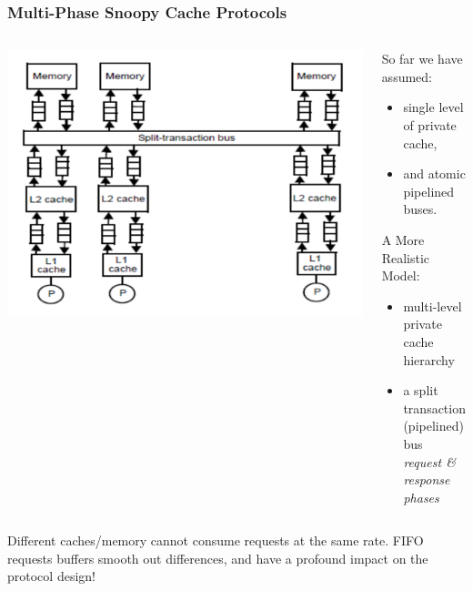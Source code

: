 \documentclass{beamer}
\newcommand{\emp}[1]{\textcolor{DikuRed}{ #1}}
\begin{document}
\begin{frame}[fragile,t]
\frametitle{Multi-Phase Snoopy Cache Protocols}

\begin{columns}\hspace{-8ex}
\includegraphics[width=50ex]{Figures/FigsInfCoherence/MultiLevCache}\pause
{}
\begin{scriptsize}
So far we have assumed:
\begin{itemize}
    \item single level of private cache, 
    \item and atomic pipelined buses.
\end{itemize}
\bigskip
\emp{A More Realistic Model:}
\begin{itemize}
    \item \emp{multi-level private cache hierarchy}
    \item \emp{a split transaction (pipelined) bus}\\
            {\em request \& response phases}
\end{itemize}
\end{scriptsize}
\end{columns}
\bigskip

Different caches/memory cannot consume requests at the same rate.
\emp{FIFO requests buffers} smooth out differences, and \emp{have a profound 
impact on the protocol design!}

\end{frame}
\end{document}
